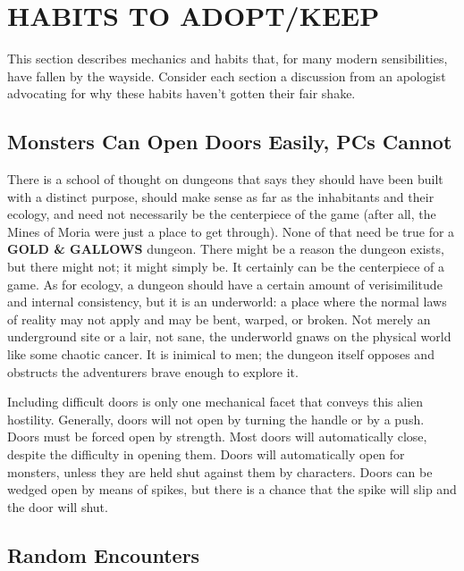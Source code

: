 \documentclass[twoside]{article}
\begin{document}
\section*{HABITS TO ADOPT/KEEP}

This section describes mechanics and habits that, for many modern sensibilities, have fallen by the wayside. Consider each section a discussion from an apologist advocating for why these habits haven't gotten their fair shake.

\subsection*{Monsters Can Open Doors Easily, PCs Cannot}

There is a school of thought on dungeons that says they should have been built with a distinct purpose, should make sense as far as the inhabitants and their ecology, and need not necessarily be the centerpiece of the game (after all, the Mines of Moria were just a place to get through). None of that need be true for a \textbf{GOLD \& GALLOWS} dungeon. There might be a reason the dungeon exists, but there might not; it might simply be. It certainly can be the centerpiece of a game. As for ecology, a dungeon should have a certain amount of verisimilitude and internal consistency, but it is an underworld: a place where the normal laws of reality may not apply and may be bent, warped, or broken. Not merely an underground site or a lair, not sane, the underworld gnaws on the physical world like some chaotic cancer. It is inimical to men; the dungeon itself opposes and obstructs the adventurers brave enough to explore it.

\bigbreak

Including difficult doors is only one mechanical facet that conveys this alien hostility. Generally, doors will not open by turning the handle or by a push. Doors must be forced open by strength. Most doors will automatically close, despite the difficulty in opening them. Doors will automatically open for monsters, unless they are held shut against them by characters. Doors can be wedged open by means of spikes, but there is a chance that the spike will slip and the door will shut.

\subsection*{Random Encounters}
\end{document}
